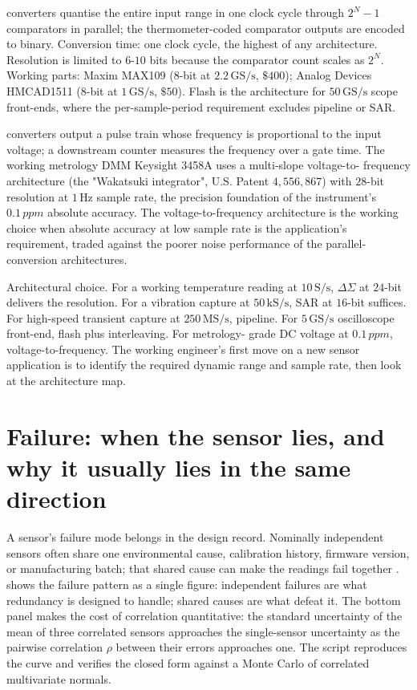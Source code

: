  converters quantise the entire input range in
one clock cycle through $2^{N} - 1$ comparators in parallel; the
thermometer-coded comparator outputs are encoded to binary.
Conversion time: one clock cycle, the highest of any
architecture. Resolution is limited to $6$-$10$ bits because the
comparator count scales as $2^{N}$. Working parts: Maxim
MAX109 ($8$-bit at $2.2\,\text{GS/s}$, $\$400$);
Analog Devices HMCAD1511 ($8$-bit at $1\,\text{GS/s}$, $\$50$).
Flash is the architecture for $50\,\text{GS/s}$ scope front-ends,
where the per-sample-period requirement excludes pipeline or SAR.

 converters output a pulse train
whose frequency is proportional to the input voltage; a downstream
counter measures the frequency over a gate time. The working
metrology DMM Keysight 3458A uses a multi-slope voltage-to-
frequency architecture (the "Wakatsuki integrator", U.S. Patent
$4{,}556{,}867$) with $28$-bit resolution at $1\,\si{\hertz}$
sample rate, the precision foundation of the instrument's
$0.1\,\si{ppm}$ absolute accuracy. The voltage-to-frequency
architecture is the working choice when absolute accuracy at low
sample rate is the application's requirement, traded against the
poorer noise performance of the parallel-conversion
architectures.

Architectural choice. For a working temperature reading at
$10\,\text{S/s}$, $\Delta\Sigma$ at $24$-bit
delivers the resolution. For a vibration capture at $50\,\text{kS/s}$,
SAR at $16$-bit suffices. For high-speed transient capture at
$250\,\text{MS/s}$, pipeline. For $5\,\text{GS/s}$
oscilloscope front-end, flash plus interleaving. For metrology-
grade DC voltage at $0.1\,\si{ppm}$, voltage-to-frequency. The
working engineer's first move on a new sensor application is to
identify the required dynamic range and sample rate, then look
at the architecture map.

\section{Failure: when the sensor lies, and why it usually lies in
the same direction}

A sensor's failure mode belongs in the design record. Nominally
independent sensors often share one environmental cause, calibration
history, firmware version, or manufacturing batch; that shared cause
can make the readings fail together \cite{gen:perrow1984}.
 shows the failure pattern as a
single figure: independent failures are what redundancy is designed
to handle; shared causes are what defeat it. The bottom panel makes
the cost of correlation quantitative: the standard uncertainty of
the mean of three correlated sensors approaches the single-sensor
uncertainty as the pairwise correlation $\rho$ between their errors
approaches one. The script
 reproduces the curve and
verifies the closed form against a Monte Carlo of correlated
multivariate normals.

